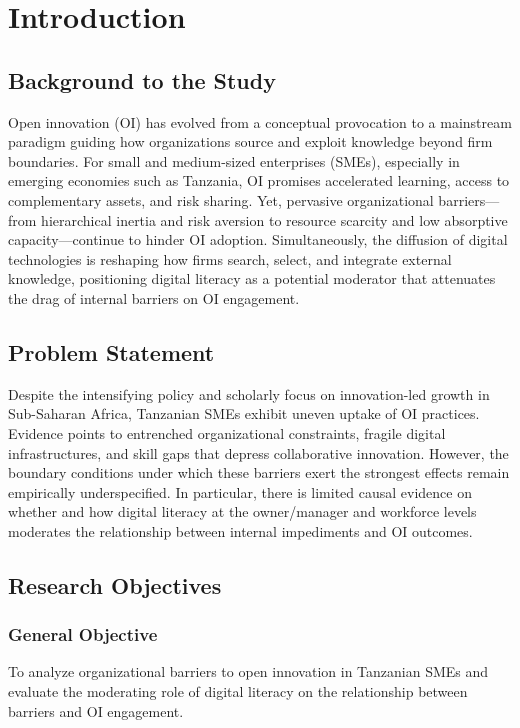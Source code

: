 \chapter{Introduction}\label{ch:introduction}

\section{Background to the Study}\label{sec:background}
Open innovation (OI) has evolved from a conceptual provocation to a mainstream paradigm guiding how organizations source and exploit knowledge beyond firm boundaries. For small and medium-sized enterprises (SMEs), especially in emerging economies such as Tanzania, OI promises accelerated learning, access to complementary assets, and risk sharing. Yet, pervasive organizational barriers---from hierarchical inertia and risk aversion to resource scarcity and low absorptive capacity---continue to hinder OI adoption. Simultaneously, the diffusion of digital technologies is reshaping how firms search, select, and integrate external knowledge, positioning digital literacy as a potential moderator that attenuates the drag of internal barriers on OI engagement.

\section{Problem Statement}\label{sec:problem}
Despite the intensifying policy and scholarly focus on innovation-led growth in Sub-Saharan Africa, Tanzanian SMEs exhibit uneven uptake of OI practices. Evidence points to entrenched organizational constraints, fragile digital infrastructures, and skill gaps that depress collaborative innovation. However, the boundary conditions under which these barriers exert the strongest effects remain empirically underspecified. In particular, there is limited causal evidence on whether and how digital literacy at the owner/manager and workforce levels moderates the relationship between internal impediments and OI outcomes.

\section{Research Objectives}\label{sec:objectives}
\subsection{General Objective}
To analyze organizational barriers to open innovation in Tanzanian SMEs and evaluate the moderating role of digital literacy on the relationship between barriers and OI engagement.

